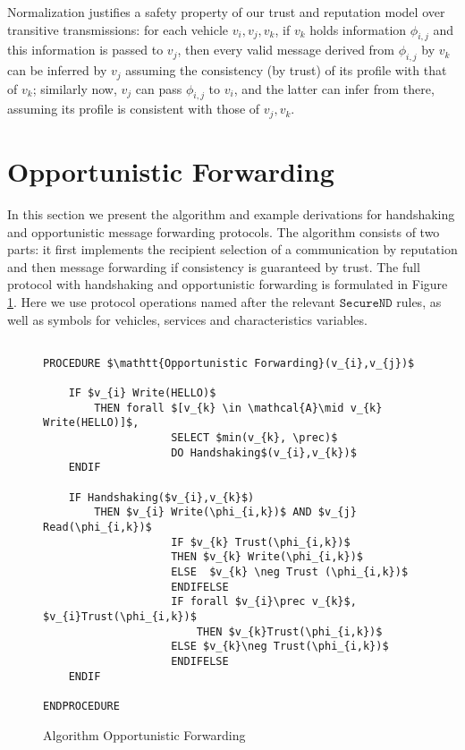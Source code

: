 \documentclass[compsoc, conference, letterpaper, 10pt, times]{IEEEtran}
\begin{document}
Normalization justifies a safety property of our trust and reputation model over transitive transmissions: for each vehicle $v_{i}, v_{j}, v_{k}$, if $v_{k}$ holds information $\phi_{i,j}$ and this information is passed to $v_{j}$, then every valid message derived from $\phi_{i,j}$ by $v_{k}$ can be inferred by $v_{j}$ assuming the consistency (by trust) of its profile with that of $v_{k}$; similarly now, $v_{j}$ can pass $\phi_{i,j}$ to $v_{i}$, and the latter can infer from there, assuming its profile is consistent with those of $v_{j}, v_{k}$.



\section{Opportunistic Forwarding}\label{sec:opportunistic}



In this section we present the algorithm and example derivations for handshaking and opportunistic message forwarding protocols. The algorithm consists of two parts: it first implements the recipient selection of a communication by reputation and then message forwarding if consistency is guaranteed by trust. The full protocol with handshaking and opportunistic forwarding is formulated in Figure \ref{fig:routine1}. Here we use protocol operations named after the relevant $\mathtt{SecureND}$ rules, as well as symbols for vehicles, services and characteristics variables.


\begin{figure}[t]
	\lstset{language=Java,
		basicstyle=\scriptsize,
		mathescape}
%	
	\begin{lstlisting}[frame=single]  % Start your code-block
	
PROCEDURE $\mathtt{Opportunistic Forwarding}(v_{i},v_{j})$
	
	IF $v_{i} Write(HELLO)$ 
	    THEN forall $[v_{k} \in \mathcal{A}\mid v_{k} Write(HELLO)]$, 
					SELECT $min(v_{k}, \prec)$
					DO Handshaking$(v_{i},v_{k})$
	ENDIF
			
	IF Handshaking($v_{i},v_{k}$)
		THEN $v_{i} Write(\phi_{i,k})$ AND $v_{j} Read(\phi_{i,k})$ 
					IF $v_{k} Trust(\phi_{i,k})$
					THEN $v_{k} Write(\phi_{i,k})$
					ELSE  $v_{k} \neg Trust (\phi_{i,k})$
					ENDIFELSE
					IF forall $v_{i}\prec v_{k}$, $v_{i}Trust(\phi_{i,k})$
						THEN $v_{k}Trust(\phi_{i,k})$
					ELSE $v_{k}\neg Trust(\phi_{i,k})$
					ENDIFELSE
	ENDIF
				
ENDPROCEDURE
	\end{lstlisting}
	\caption{Algorithm Opportunistic Forwarding}\label{fig:routine1}
\end{figure}
\end{document}

